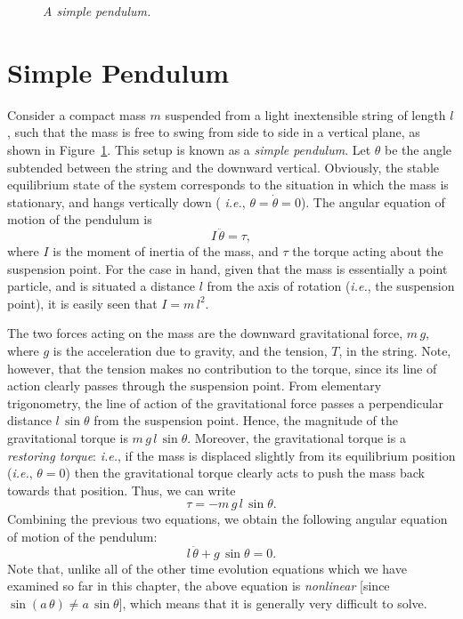 \begin{figure}
\epsfysize=2.75in
\centerline{}
\caption{\em A simple pendulum.}\label{f2.5}  
\end{figure}

\section{Simple Pendulum}\label{spen}
Consider a compact mass $m$ suspended from a light inextensible string of length $l$, such that the
mass is free to swing from side to side in a vertical plane, as shown in 
Figure~\ref{f2.5}.
This setup is known as a {\em simple pendulum}. 
 Let $\theta$ be the angle subtended between the string and
the downward vertical. Obviously, the stable equilibrium state of the system corresponds to
the situation in which the mass is stationary, and hangs vertically down ({\em 
i.e.}, $\theta=\dot{\theta}=0$).
The angular equation of motion of the pendulum is 
\begin{equation}
I\,\ddot{\theta} = \tau,
\end{equation}
where $I$ is the moment of inertia of the mass, and $\tau$ the torque acting 
about the suspension point.
For the
case in hand, given that the mass is essentially a point particle, and is situated a distance $l$ from
the axis of rotation ({\em i.e.}, the suspension point), it is easily seen that 
$I=m\,l^2$. 

The two forces acting on the mass are the downward gravitational force, $m\,g$, where $g$ is the acceleration due to gravity, 
 and the tension, $T$, in the string.
Note, however, that the tension makes no contribution to the torque, 
since its line of action clearly passes
through the suspension point. From elementary trigonometry, 
the line of action of the gravitational force passes a perpendicular distance $l\,\sin\theta$ 
from the
suspension point. Hence, the magnitude of the gravitational torque is $m\,g\,l\,
\sin\theta$.
Moreover, the gravitational torque is  a {\em restoring torque}: {\em i.e.}, if 
the mass is
displaced slightly from its equilibrium position ({\em i.e.}, $\theta =0$) then the
 gravitational torque clearly acts
 to push the mass back towards that position. Thus, we can write
\begin{equation}
\tau = - m\,g\,l\,\sin\theta.
\end{equation}
Combining the previous two equations, we obtain the following  angular equation 
of motion of the pendulum:
\begin{equation}\label{epend}
l\,\ddot{\theta} + g\,\sin\theta=0.
\end{equation}
Note that, unlike all of the other time evolution equations which we have
examined so far in this chapter, the above equation is {\em nonlinear} [since $\sin(a\,\theta)\neq a\,\sin\theta$], which means that it is generally
very difficult to solve.

